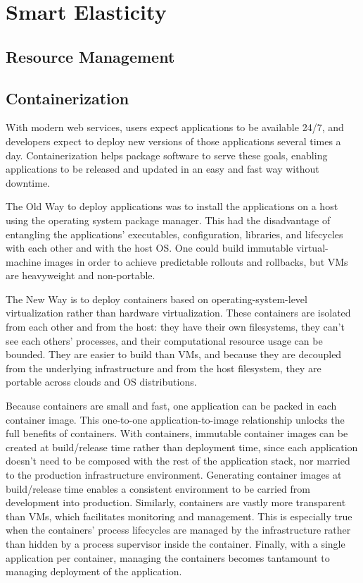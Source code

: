 \chapter{Smart Elasticity}
\label{chp:smart-elasticity}


\lipsum[1]


\section{Resource Management}
\label{sec:containers-orchestration-resource-management}

\lipsum[1]


\section{Containerization}
\label{sec:containers-orchestration-containerization}

With modern web services, users expect applications to be available 24/7, and developers expect to deploy new versions of those applications several times a day. Containerization helps package software to serve these goals, enabling applications to be released and updated in an easy and fast way without downtime.

The Old Way to deploy applications was to install the applications on a host using the operating system package manager. This had the disadvantage of entangling the applications’ executables, configuration, libraries, and lifecycles with each other and with the host OS. One could build immutable virtual-machine images in order to achieve predictable rollouts and rollbacks, but VMs are heavyweight and non-portable.

The New Way is to deploy containers based on operating-system-level virtualization rather than hardware virtualization. These containers are isolated from each other and from the host: they have their own filesystems, they can’t see each others’ processes, and their computational resource usage can be bounded. They are easier to build than VMs, and because they are decoupled from the underlying infrastructure and from the host filesystem, they are portable across clouds and OS distributions.

Because containers are small and fast, one application can be packed in each container image. This one-to-one application-to-image relationship unlocks the full benefits of containers. With containers, immutable container images can be created at build/release time rather than deployment time, since each application doesn’t need to be composed with the rest of the application stack, nor married to the production infrastructure environment. Generating container images at build/release time enables a consistent environment to be carried from development into production. Similarly, containers are vastly more transparent than VMs, which facilitates monitoring and management. This is especially true when the containers’ process lifecycles are managed by the infrastructure rather than hidden by a process supervisor inside the container. Finally, with a single application per container, managing the containers becomes tantamount to managing deployment of the application.

